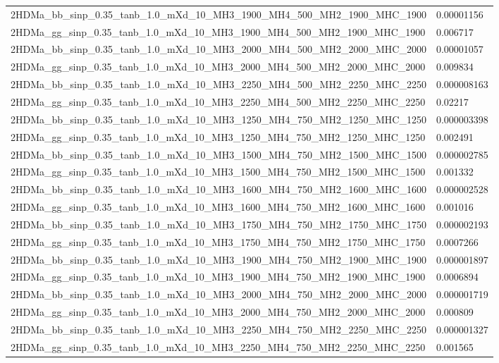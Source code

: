 \begin{table}
\begin{center}
\begin{adjustbox}{width=\textwidth}
\begin{tabular}{|l|l|}
        2HDMa\_bb\_sinp\_0.35\_tanb\_1.0\_mXd\_10\_MH3\_1900\_MH4\_500\_MH2\_1900\_MHC\_1900 & 0.00001156  \\
        2HDMa\_gg\_sinp\_0.35\_tanb\_1.0\_mXd\_10\_MH3\_1900\_MH4\_500\_MH2\_1900\_MHC\_1900 & 0.006717    \\
        2HDMa\_bb\_sinp\_0.35\_tanb\_1.0\_mXd\_10\_MH3\_2000\_MH4\_500\_MH2\_2000\_MHC\_2000 & 0.00001057  \\
        2HDMa\_gg\_sinp\_0.35\_tanb\_1.0\_mXd\_10\_MH3\_2000\_MH4\_500\_MH2\_2000\_MHC\_2000 & 0.009834    \\
        2HDMa\_bb\_sinp\_0.35\_tanb\_1.0\_mXd\_10\_MH3\_2250\_MH4\_500\_MH2\_2250\_MHC\_2250 & 0.000008163 \\
        2HDMa\_gg\_sinp\_0.35\_tanb\_1.0\_mXd\_10\_MH3\_2250\_MH4\_500\_MH2\_2250\_MHC\_2250 & 0.02217     \\
        2HDMa\_bb\_sinp\_0.35\_tanb\_1.0\_mXd\_10\_MH3\_1250\_MH4\_750\_MH2\_1250\_MHC\_1250 & 0.000003398 \\
        2HDMa\_gg\_sinp\_0.35\_tanb\_1.0\_mXd\_10\_MH3\_1250\_MH4\_750\_MH2\_1250\_MHC\_1250 & 0.002491    \\
        2HDMa\_bb\_sinp\_0.35\_tanb\_1.0\_mXd\_10\_MH3\_1500\_MH4\_750\_MH2\_1500\_MHC\_1500 & 0.000002785 \\
        2HDMa\_gg\_sinp\_0.35\_tanb\_1.0\_mXd\_10\_MH3\_1500\_MH4\_750\_MH2\_1500\_MHC\_1500 & 0.001332    \\
        2HDMa\_bb\_sinp\_0.35\_tanb\_1.0\_mXd\_10\_MH3\_1600\_MH4\_750\_MH2\_1600\_MHC\_1600 & 0.000002528 \\
        2HDMa\_gg\_sinp\_0.35\_tanb\_1.0\_mXd\_10\_MH3\_1600\_MH4\_750\_MH2\_1600\_MHC\_1600 & 0.001016    \\
        2HDMa\_bb\_sinp\_0.35\_tanb\_1.0\_mXd\_10\_MH3\_1750\_MH4\_750\_MH2\_1750\_MHC\_1750 & 0.000002193 \\
        2HDMa\_gg\_sinp\_0.35\_tanb\_1.0\_mXd\_10\_MH3\_1750\_MH4\_750\_MH2\_1750\_MHC\_1750 & 0.0007266   \\
        2HDMa\_bb\_sinp\_0.35\_tanb\_1.0\_mXd\_10\_MH3\_1900\_MH4\_750\_MH2\_1900\_MHC\_1900 & 0.000001897 \\
        2HDMa\_gg\_sinp\_0.35\_tanb\_1.0\_mXd\_10\_MH3\_1900\_MH4\_750\_MH2\_1900\_MHC\_1900 & 0.0006894   \\
        2HDMa\_bb\_sinp\_0.35\_tanb\_1.0\_mXd\_10\_MH3\_2000\_MH4\_750\_MH2\_2000\_MHC\_2000 & 0.000001719 \\
        2HDMa\_gg\_sinp\_0.35\_tanb\_1.0\_mXd\_10\_MH3\_2000\_MH4\_750\_MH2\_2000\_MHC\_2000 & 0.000809    \\
        2HDMa\_bb\_sinp\_0.35\_tanb\_1.0\_mXd\_10\_MH3\_2250\_MH4\_750\_MH2\_2250\_MHC\_2250 & 0.000001327 \\
        2HDMa\_gg\_sinp\_0.35\_tanb\_1.0\_mXd\_10\_MH3\_2250\_MH4\_750\_MH2\_2250\_MHC\_2250 & 0.001565    \\


\end{tabular}
\end{adjustbox}
\end{center}
\end{table}
